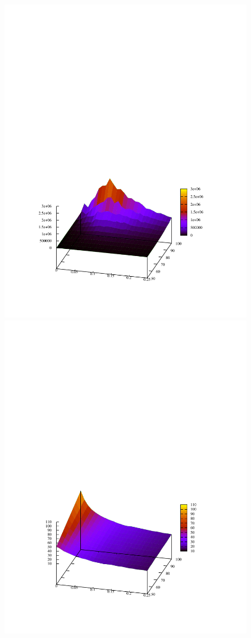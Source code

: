 \documentclass{l4proj}
\begin{document}
\begin{figure}
\vspace{-7cm}
\begin{center}
\hspace{-3.5cm}
\begin{minipage}[t]{0.49\textwidth}
\includegraphics[height=14.0cm]{bbmc1-smallWorld-1000.pdf}
\end{minipage}
\begin{minipage}[t]{0.49\textwidth}
\includegraphics[height=14.0cm]{bbmc1-smallWorld-1000-cliqueSize.pdf}

\end{minipage}
\end{center}
\end{figure}
\end{document}
